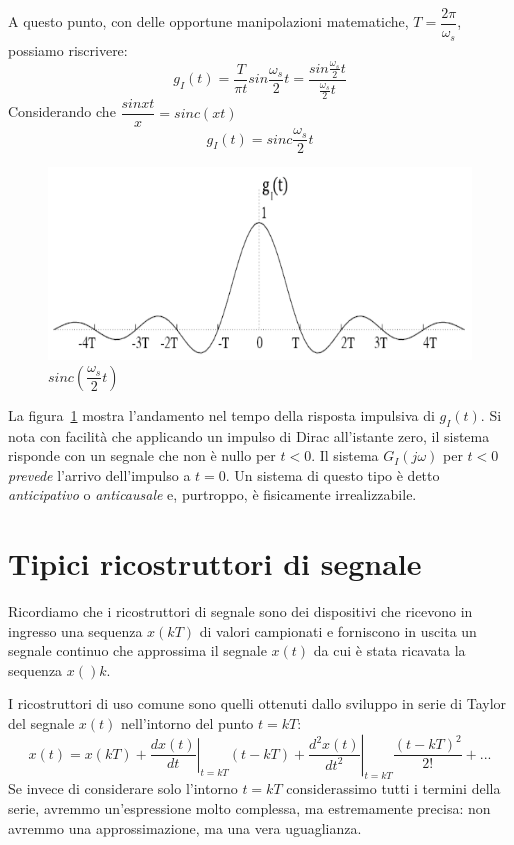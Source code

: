 \documentclass[a4paper]{report}
\begin{document}
A questo punto, con delle opportune manipolazioni matematiche, $T =
\dfrac{2 \pi}{\omega_s}$, possiamo riscrivere:
\[
g_I(t) = \dfrac{T}{\pi t}sin\dfrac{\omega_s}{2}t = \dfrac{sin
  \frac{\omega_s}{2}t}{\frac{\omega_s}{2}t} 
\]
Considerando che $\dfrac{sin xt}{x} = sinc (xt)$
\[
g_I(t) = sinc \dfrac{\omega_s}{2}t
\]
\begin{figure}[!h]
  \begin{center}
    \includegraphics[scale=0.5]{./figures/filtroIdealesinc.png}
    \caption{$sinc(\dfrac{\omega_s}{2}t)$}\label{fig:filtroIdealesinc}
  \end{center}
\end{figure}
La figura~\ref{fig:filtroIdealesinc} mostra l'andamento nel tempo
della risposta impulsiva di $g_I(t)$. Si nota con facilit\`a che
applicando un impulso di Dirac all'istante zero, il sistema risponde
con un segnale che non \`e nullo per $t < 0$. Il sistema $G_I(j
\omega)$ per $t < 0$ {\em prevede} l'arrivo dell'impulso a $t = 0$. Un
sistema di questo tipo \`e detto {\em anticipativo} o {\em anticausale} e,
purtroppo, \`e fisicamente irrealizzabile.

\section{Tipici ricostruttori di segnale}
Ricordiamo che i ricostruttori di segnale sono dei dispositivi che
ricevono in ingresso una sequenza $x(kT)$ di valori campionati e
forniscono in uscita un segnale continuo che approssima il segnale
$x(t)$ da cui \`e stata ricavata la sequenza $x()k$.

I ricostruttori di uso comune sono quelli ottenuti dallo sviluppo in
serie di Taylor del segnale $x(t)$ nell'intorno del punto $t = kT$:
\begin{equation}\label{eq:taylorRicostruttori}
  x(t) = x(kT) + \left. \dfrac{dx(t)}{dt}\right|_{t = kT} (t - kT) +
  \left. \dfrac{d^2x(t)}{dt^2}\right|_{t = kT} \dfrac{(t - kT)^2}{2!}
  + ...
\end{equation}
Se invece di considerare solo l'intorno $t = kT$ considerassimo tutti
i termini della serie, avremmo un'espressione molto complessa, ma
estremamente precisa: non avremmo una approssimazione, ma una vera
uguaglianza.
\end{document}
